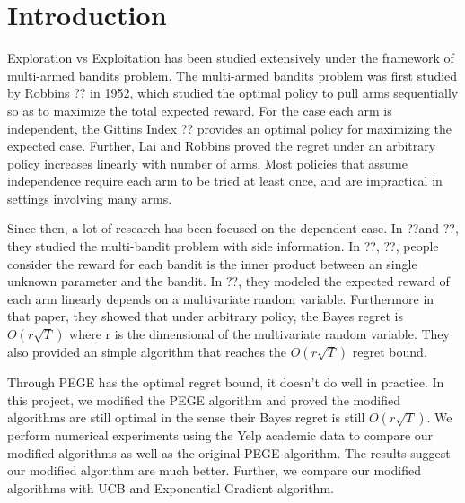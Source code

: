 \documentclass{article}
\theoremstyle{plain}
\theoremstyle{definition}
\begin{document}
 


\section{Introduction}

Exploration vs Exploitation has been studied extensively under the framework of multi-armed bandits problem. The multi-armed bandits problem was first studied by Robbins ?? in 1952, which studied the optimal policy to pull arms sequentially so as to maximize the total expected reward. For the case each arm is independent, the Gittins Index ?? provides an optimal policy for maximizing the expected case. Further, Lai and Robbins proved the regret under an arbitrary policy increases linearly with number of arms. Most policies that assume independence require each arm to be tried at least once, and are impractical in settings involving many arms. 

Since then, a lot of research has been focused on the dependent case. In ??and ??, they studied the multi-bandit problem with side information. In ??, ??, people consider the reward for each bandit is the inner product between an single unknown parameter and the bandit. In ??, they modeled the expected reward of each arm linearly depends on a multivariate random variable. Furthermore in that paper, they showed that under arbitrary policy, the Bayes regret is $O(r\sqrt{T})$ where r is the dimensional of the multivariate random variable. They also provided an simple algorithm that reaches the $O(r\sqrt{T})$ regret bound.

Through PEGE has the optimal regret bound, it doesn't do well in practice. In this project, we modified the PEGE algorithm and proved the modified algorithms are still optimal in the sense their Bayes regret is still $O(r\sqrt{T})$. We perform numerical experiments using the Yelp academic data to compare our modified algorithms as well as the original PEGE algorithm. The results suggest our modified algorithm are much better. Further, we compare our modified algorithms with UCB and Exponential Gradient algorithm. 
\end{document}
